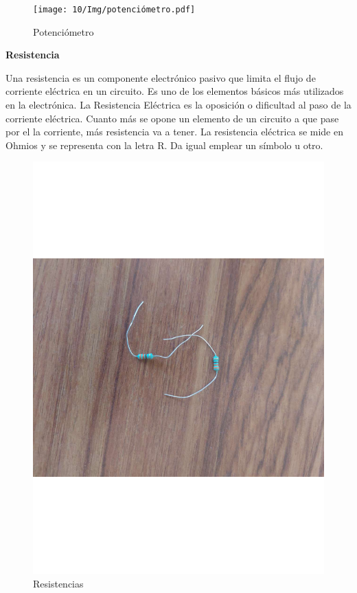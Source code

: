 \begin{figure}[H]
        \centering
        \texttt{[image: 10/Img/potenciómetro.pdf]}
        \caption{Potenciómetro}
        \label{Potenciómetro}
\end{figure}

\textbf{Resistencia}

Una resistencia es un componente electrónico pasivo que limita el flujo de corriente eléctrica en un circuito. Es uno de los elementos básicos más utilizados en la electrónica.
La Resistencia Eléctrica es la oposición o dificultad al paso de la corriente eléctrica. Cuanto más se opone un elemento de un circuito a que pase por el la corriente, más resistencia va a tener. La resistencia eléctrica se mide en Ohmios y se representa con la letra R. Da igual emplear un símbolo u otro.\cite{Resistencias}

\begin{figure}[H]
        \centering
        \includegraphics[trim = {0mm 0mm 0mm 0mm},clip,scale=0.2]{10/Img/resistencias.pdf}
        \caption{Resistencias}
        \label{Resistencias}
\end{figure}

